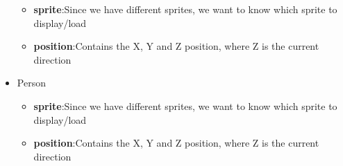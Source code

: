 \documentclass[12pt]{article}
\begin{document}
\begin{itemize}
			\begin{itemize}
				\item \textbf{sprite}:\quad Since we have different sprites, we want to know which sprite to display/load
				\item \textbf{position}:\quad Contains the X, Y and Z position, where Z is the current direction
			\end{itemize}
		\item Person
			\begin{itemize}
				\item \textbf{sprite}:\quad Since we have different sprites, we want to know which sprite to display/load
				\item \textbf{position}:\quad Contains the X, Y and Z position, where Z is the current direction
			\end{itemize}
	\end{itemize}
\end{document}
